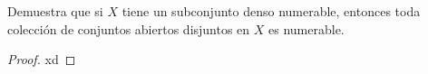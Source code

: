 
  \item Demuestra que si $X$ tiene un subconjunto denso numerable, entonces toda colección de conjuntos abiertos disjuntos en $X$ es numerable.

  \begin{proof}
      xd
  \end{proof}